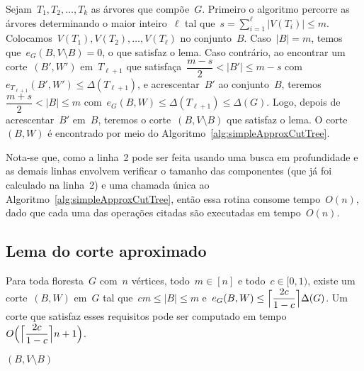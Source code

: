 	Sejam~${T_1, T_2, \ldots,T_k}$ as árvores que compõe~$G$. 
	Primeiro o algoritmo percorre as árvores determinando
	o maior inteiro~$\ell$ tal 
	que~${s=\displaystyle\sum_{i=1}^{\ell}|V(T_i)| \le m}$.
	Colocamos~${V(T_1),V(T_2), \ldots,V(T_\ell)}$ no conjunto~$B$.
	Caso~${|B|=m}$, temos que~${e_G(B,V\setminus B)=0}$, o que 
	satisfaz o lema.
	Caso contrário, ao encontrar um corte~$(B',W')$ em~$T_{\ell+1}$
	que satisfaça~${\dfrac{m-s}{2}<|B'|\le m-s}$ 
	com~${e_{T_{\ell+1}}(B',W') \le \Delta(T_{\ell+1})}$, e 
	acrescentar~$B'$ ao conjunto~$B$, 
	teremos~${\dfrac{m+s}{2}<|B| \le m}$ 
	com~${e_G(B,W)\le\Delta(T_{\ell+1}) \le \Delta(G)}$.
	Logo, depois de acrescentar~$B'$ em~$B$, teremos o 
	corte~${(B,V\setminus B)}$ que satisfaz o lema.
	O corte~$(B,W)$ é encontrado por meio do 
	Algoritmo~\ref{alg:simpleApproxCutTree}.

	
	Nota-se que, como a linha~2 pode ser feita usando uma busca em 
	profundidade e as demais linhas envolvem verificar o tamanho 
	das componentes (que já foi calculado na linha~2) e uma 
	chamada única ao Algoritmo~\ref{alg:simpleApproxCutTree}, então 
	essa rotina consome tempo~$O(n)$, dado que cada uma 
	das operações citadas são executadas em tempo~$O(n)$. 

\bigskip
\bigskip
\bigskip



\subsection{Lema do corte aproximado}

\begin{lem}
\label{lema:approxCutForest}
	Para toda floresta~$G$ com~$n$ vértices, todo~$m \in [n]$ e 
	todo~$c \in [0,1)$, existe um corte~$(B,W)$ em~$G$ tal 
	que~$cm \le |B| \le m$ 
	e~$e_G(B,W) \le \ceil[\Big]{ \dfrac{2c}{1-c}} \Delta(G)$.
	Um corte que satisfaz esses requisitos pode ser computado em
	tempo~$O\Big(\ceil[\Big]{ \dfrac{2c}{1-c}} n+1\Big)$.
\end{lem}

\medskip
\medskip

\begin{algorithm}[H]
\label{alg:approxCutForest}

	\caption{Computa corte aproximado em uma floresta}
	\Return $(B,V\setminus B)$

\end{algorithm}	

